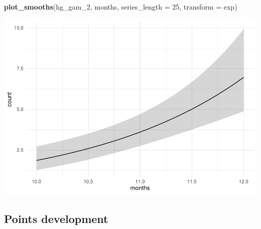 \documentclass[]{article}
\newenvironment{Shaded}{\begin{snugshade}}{\end{snugshade}}
\newcommand{\DataTypeTok}[1]{\textcolor[rgb]{0.13,0.29,0.53}{#1}}
\newcommand{\DecValTok}[1]{\textcolor[rgb]{0.00,0.00,0.81}{#1}}
\newcommand{\FloatTok}[1]{\textcolor[rgb]{0.00,0.00,0.81}{#1}}
\newcommand{\KeywordTok}[1]{\textcolor[rgb]{0.13,0.29,0.53}{\textbf{#1}}}
\newcommand{\NormalTok}[1]{#1}
\newcommand{\OperatorTok}[1]{\textcolor[rgb]{0.81,0.36,0.00}{\textbf{#1}}}
\newcommand{\StringTok}[1]{\textcolor[rgb]{0.31,0.60,0.02}{#1}}
\begin{document}
\begin{Shaded}
\begin{Highlighting}[]
\KeywordTok{plot_smooths}\NormalTok{(hg_gam_}\DecValTok{2}\NormalTok{, months, }\DataTypeTok{series_length =} \DecValTok{25}\NormalTok{, }\DataTypeTok{transform =}\NormalTok{ exp)}
\end{Highlighting}
\end{Shaded}

\includegraphics{supplement_files/figure-latex/hg-gam-2-plot-1.pdf}

\hypertarget{points-development}{%
\subsection{Points development}\label{points-development}}

\begin{Shaded}
\end{Shaded}
\end{document}
